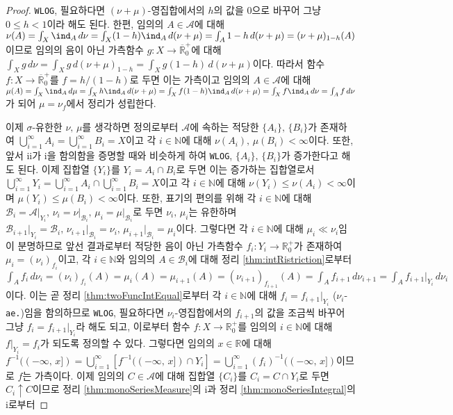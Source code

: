 \begin{proof}
    \texttt{WLOG}, 필요하다면 $(\nu+\mu)$-영집합에서의 $h$의 값을 $0$으로 바꾸어 그냥 $0\leq h<1$이라 해도 된다. 한편, 임의의 $A\in\mathcal{A}$에 대해 $\nu(A)=\int_X\ind_A\,d\nu=\int_X(1-h)\ind_A\,d(\nu+\mu)=\int_A1-h\,d(\nu+\mu)=(\nu+\mu)_{1-h}(A)$이므로 임의의 음이 아닌 가측함수 $g:X\to\overline{\mathbb{R}}^+_0$에 대해 $\int_Xg\,d\nu=\int_Xg\,d(\nu+\mu)_{1-h}=\int_Xg(1-h)\,d(\nu+\mu)$이다. 따라서 함수 $f:X\to\overline{\mathbb{R}}^+_0$를 $f=h/(1-h)$로 두면 이는 가측이고 임의의 $A\in\mathcal{A}$에 대해 $\mu(A)=\int_X\ind_A\,d\mu=\int_Xh\ind_A\,d(\nu+\mu)=\int_Xf(1-h)\ind_A\,d(\nu+\mu)=\int_Xf\ind_A\,d\nu=\int_Af\,d\nu$가 되어 $\mu=\nu_f$에서 정리가 성립한다.

    이제 $\sigma$-유한한 $\nu,\,\mu$를 생각하면 정의로부터 $\mathcal{A}$에 속하는 적당한 $\{A_i\},\,\{B_i\}$가 존재하여 $\bigcup_{i=1}^\infty A_i=\bigcup_{i=1}^\infty B_i=X$이고 각 $i\in\mathbb{N}$에 대해 $\nu(A_i),\,\mu(B_i)<\infty$이다. 또한, 앞서 ii가 i을 함의함을 증명할 때와 비슷하게 하여 \texttt{WLOG}, $\{A_i\},\,\{B_i\}$가 증가한다고 해도 된다. 이제 집합열 $\{Y_i\}$를 $Y_i=A_i\cap B_i$로 두면 이는 증가하는 집합열로서 $\bigcup_{i=1}^\infty Y_i=\bigcup_{i=1}^\infty A_i\cap\bigcup_{i=1}^\infty B_i=X$이고 각 $i\in\mathbb{N}$에 대해 $\nu(Y_i)\leq\nu(A_i)<\infty$이며 $\mu(Y_i)\leq\mu(B_i)<\infty$이다. 또한, 표기의 편의를 위해 각 $i\in\mathbb{N}$에 대해 $\mathcal{B}_i=\mathcal{A}\vert_{Y_i},\,\nu_i=\nu\vert_{\mathcal{B}_i},\,\mu_i=\mu\vert_{\mathcal{B}_i}$로 두면 $\nu_i,\,\mu_i$는 유한하며 $\mathcal{B}_{i+1}\vert_{Y_i}=\mathcal{B}_i,\,\nu_{i+1}\vert_{\mathcal{B}_i}=\nu_i,\,\mu_{i+1}\vert_{\mathcal{B}_i}=\mu_i$이다. 그렇다면 각 $i\in\mathbb{N}$에 대해 $\mu_i\ll\nu_i$임이 분명하므로 앞선 결과로부터 적당한 음이 아닌 가측함수 $f_i:Y_i\to\mathbb{R}^+_0$가 존재하여 $\mu_i=(\nu_i)_{f_i}$이고, 각 $i\in\mathbb{N}$와 임의의 $A\in\mathcal{B}_i$에 대해 정리 \ref{thm:intRistriction}로부터 $\int_Af_i\,d\nu_i=(\nu_i)_{f_i}(A)=\mu_i(A)=\mu_{i+1}(A)=(\nu_{i+1})_{f_{i+1}}(A)=\int_Af_{i+1}\,d\nu_{i+1}=\int_Af_{i+1}\vert_{Y_i}\,d\nu_i$이다. 이는 곧 정리 \ref{thm:twoFuncIntEqual}로부터 각 $i\in\mathbb{N}$에 대해 $f_i=f_{i+1}\vert_{Y_i}$ ($\nu_i$-\texttt{ae.})임을 함의하므로 \texttt{WLOG}, 필요하다면 $\nu_i$-영집합에서의 $f_{i+1}$의 값을 조금씩 바꾸어 그냥 $f_i=f_{i+1}\vert_{Y_i}$라 해도 되고, 이로부터 함수 $f:X\to\mathbb{R}^+_0$를 임의의 $i\in\mathbb{N}$에 대해 $f\vert_{Y_i}=f_i$가 되도록 정의할 수 있다. 그렇다면 임의의 $x\in\mathbb{R}$에 대해 $f^{-1}((-\infty,\,x])=\bigcup_{i=1}^\infty[f^{-1}((-\infty,\,x])\cap Y_i]=\bigcup_{i=1}^\infty(f_i)^{-1}((-\infty,\,x])$이므로 $f$는 가측이다. 이제 임의의 $C\in\mathcal{A}$에 대해 집합열 $\{C_i\}$를 $C_i=C\cap Y_i$로 두면 $C_i\uparrow C$이므로 정리 \ref{thm:monoSeriesMeasure}의 i과 정리 \ref{thm:monoSeriesIntegral}의 i로부터

\end{proof}
